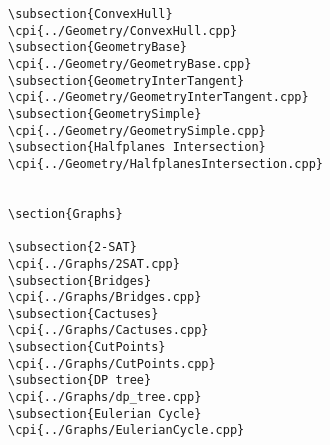 {\begin{verbatim}
\subsection{ConvexHull}
\cpi{../Geometry/ConvexHull.cpp}
\subsection{GeometryBase}
\cpi{../Geometry/GeometryBase.cpp}
\subsection{GeometryInterTangent}
\cpi{../Geometry/GeometryInterTangent.cpp}
\subsection{GeometrySimple}
\cpi{../Geometry/GeometrySimple.cpp}
\subsection{Halfplanes Intersection}
\cpi{../Geometry/HalfplanesIntersection.cpp}


\section{Graphs}

\subsection{2-SAT}
\cpi{../Graphs/2SAT.cpp}
\subsection{Bridges}
\cpi{../Graphs/Bridges.cpp}
\subsection{Cactuses}
\cpi{../Graphs/Cactuses.cpp}
\subsection{CutPoints}
\cpi{../Graphs/CutPoints.cpp}
\subsection{DP tree}
\cpi{../Graphs/dp_tree.cpp}
\subsection{Eulerian Cycle}
\cpi{../Graphs/EulerianCycle.cpp}

\end{verbatim}}
